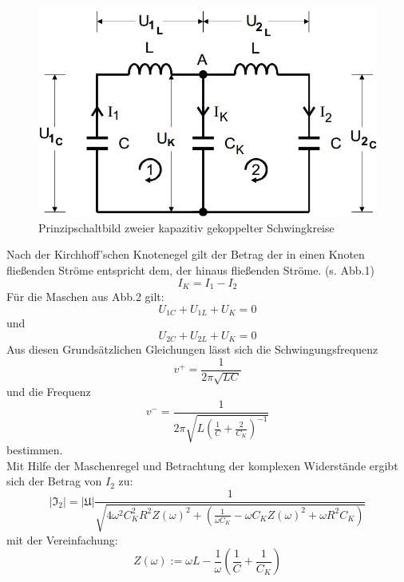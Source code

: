 \begin{figure}[h]
        \centering
        \includegraphics[scale=0.5]{Grafiken/V355Abb1.jpg}
        \caption{Prinzipschaltbild zweier kapazitiv gekoppelter Schwingkreise \cite{V355}}
        \label{fig:Abb1}
\end{figure}
Nach der Kirchhoff'schen Knotenegel gilt der Betrag der in einen Knoten fließenden Ströme entspricht dem, der hinaus fließenden Ströme. (s. Abb.1)
\begin{equation}
I_K = I_1 - I_2
\end{equation}
Für die Maschen aus Abb.2 gilt:
\begin{equation}
U_{1C} + U_{1L} + U_K = 0
\end{equation}
und
\begin{equation}
U_{2C} + U_{2L} + U_K = 0
\end{equation}
Aus diesen Grundsätzlichen Gleichungen lässt sich die Schwingungsfrequenz
\begin{equation}
v^+ = \frac{1}{2 \pi \sqrt{L C}}
\label{eq:f+}
\end{equation}
und die Frequenz
\begin{equation}
v^- = \frac{1}{2 \pi \sqrt{L\left(\frac{1}{C} + \frac{2}{C_K}\right)^{-1}}}
\label{eq:f-}
\end{equation}
bestimmen. \\
Mit Hilfe der Maschenregel und Betrachtung der komplexen Widerstände ergibt sich der Betrag von $I_2$ zu:
\begin{equation}
|\mathfrak{I}_2| = |\mathfrak{U}| \frac{1}{\sqrt{4 \omega^2 C_K^2 R^2 Z(\omega )^2 + \left(\frac{1}{\omega C_K} - \omega C_K Z(\omega )^2 + \omega R^2 C_K\right)}}
\label{eq:I2}
\end{equation}
mit der Vereinfachung:
\begin{equation*}
Z(\omega ) := \omega L - \frac{1}{\omega } \left(\frac{1}{C} + \frac{1}{C_K}\right) 
\end{equation*}

